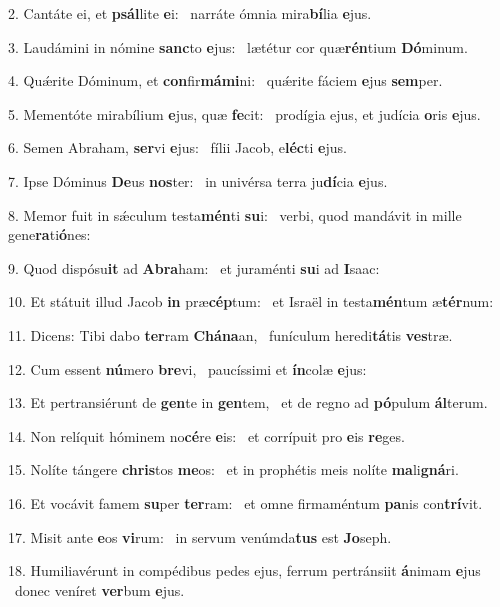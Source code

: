 2. Cantáte ei, et \textbf{psál}lite \textbf{e}i: \ast\  narráte ómnia mira\textbf{bí}lia \textbf{e}jus.\

3. Laudámini in nómine \textbf{sanc}to \textbf{e}jus: \ast\  lætétur cor quæ\textbf{rén}tium \textbf{Dó}minum.\

4. Quǽrite Dóminum, et \textbf{con}fir\textbf{má}\textbf{mi}ni: \ast\  quǽrite fáciem \textbf{e}jus \textbf{sem}per.\

5. Mementóte mirabílium \textbf{e}jus, quæ \textbf{fe}cit: \ast\  prodígia ejus, et judícia \textbf{o}ris \textbf{e}jus.\

6. Semen Abraham, \textbf{ser}vi \textbf{e}jus: \ast\  fílii Jacob, e\textbf{léc}ti \textbf{e}jus.\

7. Ipse Dóminus \textbf{De}us \textbf{nos}ter: \ast\  in univérsa terra ju\textbf{dí}cia \textbf{e}jus.\

8. Memor fuit in sǽculum testa\textbf{mén}ti \textbf{su}i: \ast\  verbi, quod mandávit in mille gene\textbf{ra}ti\textbf{ó}nes:\

9. Quod dispósu\textbf{it} ad \textbf{A}\textbf{bra}ham: \ast\  et juraménti \textbf{su}i ad \textbf{I}saac:\

10. Et státuit illud Jacob \textbf{in} præ\textbf{cép}tum: \ast\  et Israël in testa\textbf{mén}tum æ\textbf{tér}num:\

11. Dicens: Tibi dabo \textbf{ter}ram \textbf{Chá}\textbf{na}an, \ast\  funículum heredi\textbf{tá}tis \textbf{ves}træ.\

12. Cum essent \textbf{nú}mero \textbf{bre}vi, \ast\  paucíssimi et \textbf{ín}colæ \textbf{e}jus:\

13. Et pertransiérunt de \textbf{gen}te in \textbf{gen}tem, \ast\  et de regno ad \textbf{pó}pulum \textbf{ál}terum.\

14. Non relíquit hóminem no\textbf{cé}re \textbf{e}is: \ast\  et corrípuit pro \textbf{e}is \textbf{re}ges.\

15. Nolíte tángere \textbf{chris}tos \textbf{me}os: \ast\  et in prophétis meis nolíte \textbf{ma}li\textbf{gná}ri.\

16. Et vocávit famem \textbf{su}per \textbf{ter}ram: \ast\  et omne firmaméntum \textbf{pa}nis con\textbf{trí}vit.\

17. Misit ante \textbf{e}os \textbf{vi}rum: \ast\  in servum venúmda\textbf{tus} est \textbf{Jo}seph.\

18. Humiliavérunt in compédibus pedes ejus, ferrum pertránsiit \textbf{á}nimam \textbf{e}jus \ast\  donec veníret \textbf{ver}bum \textbf{e}jus.\

